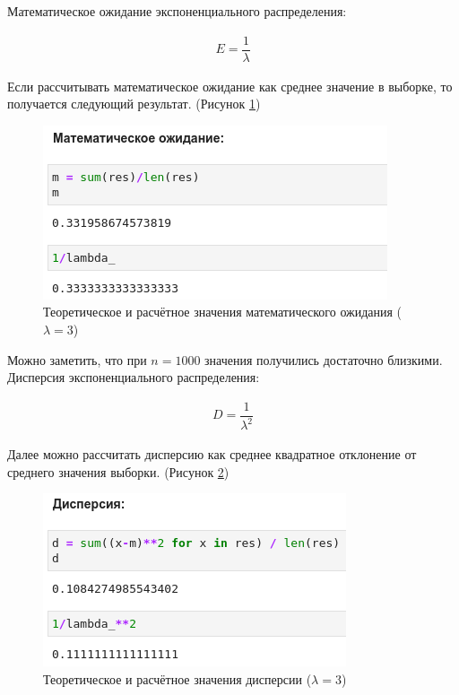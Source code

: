 \documentclass[14pt,fleqn]{extarticle}
\begin{document}
	Математическое ожидание экспоненциального распределения:
	\begin{ceqn}
		\begin{align*}
			E = \dfrac{1}{\lambda}
		\end{align*}
	\end{ceqn}
	\newpage
	Если рассчитывать математическое ожидание как среднее значение в выборке, то получается следующий результат. (Рисунок \ref{fig:exp_inverse_function_method_math})
	\begin{figure}[h]
		\centering \includegraphics[scale=0.7]{exp_inverse_function_method_math}
		\caption{Теоретическое и расчётное значения математического ожидания ($\lambda = 3$)}
		\label{fig:exp_inverse_function_method_math}
	\end{figure}

	Можно заметить, что при $n = 1000$ значения получились достаточно близкими.\\
	Дисперсия экспоненциального распределения:
	\begin{ceqn}
		\begin{align*}
			D = \dfrac{1}{\lambda^2}
		\end{align*}
	\end{ceqn}
	Далее можно рассчитать дисперсию как среднее квадратное отклонение от среднего значения выборки. (Рисунок \ref{fig:exp_inverse_function_method_var})
	\begin{figure}[h]
		\centering \includegraphics[scale=0.7]{exp_inverse_function_method_var}
		\caption{Теоретическое и расчётное значения дисперсии ($\lambda = 3$)}
		\label{fig:exp_inverse_function_method_var}
	\end{figure}
\end{document}
